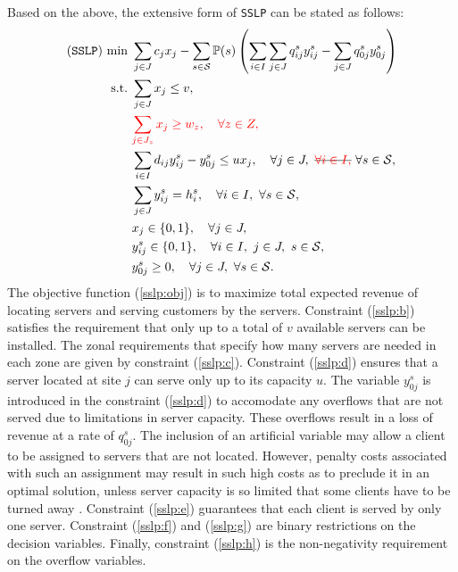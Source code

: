 Based on the above, the extensive form of \texttt{SSLP} can be stated as follows:
\begin{subequations} \label{sslp:formulation}
	\begin{align}
	(\texttt{SSLP})\ \textrm{min}\ &	\sum_{j\in J}c_j x_j - \sum_{s\in\mathcal{S}}\PP(s)\left(\sum_{i\in I}\sum_{j\in J}q_{ij}^s y_{ij}^s - \sum_{j\in J}q_{0j}^s y_{0j}^s \right) \label{sslp:obj} \\ 
	\textrm{s.t.}\ &\sum_{j\in J}x_j\le v,\label{sslp:b}\\ 
	&\textcolor{red}{\sum_{j\in J_z}x_j\ge w_z,\quad\forall z\in Z,}\label{sslp:c}\\
	&\sum_{i\in I}d_{ij}y_{ij}^s - y_{0j}^s\le ux_j,\quad\forall j\in J,\ \stkout{\textcolor{red}{\forall i\in I,}}\ \forall s\in\mathcal{S}, \label{sslp:d} \\
	&\sum_{j\in J}y_{ij}^s=h_i^s,\quad\forall i\in I,\ \forall s\in \mathcal{S}, \label{sslp:e}\\
	&x_j\in\{0,1\},\quad\forall j\in J,\label{sslp:f}\\
	&y_{ij}^s\in\{0,1\},\quad\forall i\in I,\ j\in J,\ s\in\mathcal{S}, \label{sslp:g}\\
	&y_{0j}^s\ge 0,\quad\forall j\in J,\ \forall s\in\mathcal{S} \label{sslp:h}.
	\end{align}
\end{subequations}
The objective function (\ref{sslp:obj}) is to maximize total expected revenue of locating servers and serving customers by the servers. Constraint (\ref{sslp:b}) satisfies the requirement that only up to a total of $v$ available servers can be installed. The zonal requirements that specify how many servers are needed in each zone are given by constraint (\ref{sslp:c}). Constraint (\ref{sslp:d}) ensures that a server located at site $j$ can serve only up to its capacity $u$. The variable $y_{0j}^s$ is introduced in the constraint (\ref{sslp:d}) to accomodate any overflows that are not served due to limitations in server capacity. These overflows result in a loss of revenue at a rate of $q_{0j}^s$. The inclusion of an artificial variable may allow a client to be assigned to servers that are not located. However, penalty costs associated with such an assignment may result in such high costs as to preclude it in an optimal solution, unless server capacity is so limited that some clients have to be turned away \cite{journal:NS2005}. Constraint (\ref{sslp:e}) guarantees that each client is served by only one server. Constraint (\ref{sslp:f}) and (\ref{sslp:g}) are binary restrictions on the decision variables. Finally, constraint (\ref{sslp:h}) is the non-negativity requirement on the overflow variables.
